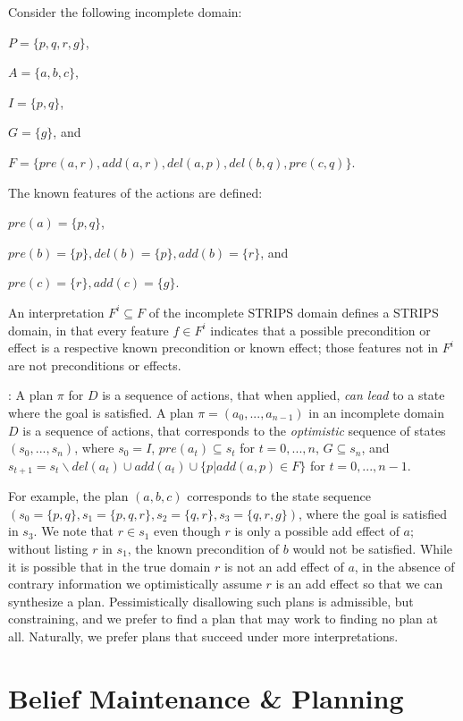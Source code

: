 \documentclass[letterpaper]{article}
\def\und#1{\noindent{\bf #1}:}
\begin{document}
Consider the following incomplete domain: 

$P = \{p, q, r, g\}$, 

${A} =
\{{a}, {b}, {c}\}$, 

$I = \{p, q\}$, 

 $G= \{g\}$, and 
 
 $F = \{pre(a, r), add(a, r),
del(a, p),del(b, q), pre(c, q) \}$.  

The
known features of the actions are defined: 

 $pre({a}) = \{p, q\}$, 
 
 $  pre({b}) =
\{p\},  del(b) = \{p\}, add({b}) = \{r\}$, and

  $ pre({c}) =
\{r\},  add({c}) = \{g\}$. 

An interpretation $F^i \subseteq F$ of the incomplete STRIPS domain
defines a STRIPS domain, in that every feature $f \in F^i$
indicates that a possible precondition or effect is a respective known
precondition or known effect; those features not in $F^i$ are
not preconditions or effects.   



\und{Incomplete STRIPS Plans} A plan $\pi$ for ${D}$ is a sequence of
actions, that when applied, {\em can lead} to a state where the goal is
satisfied.  A plan $\pi = ({a}_0,  ..., {a}_{n-1})$ in an incomplete
domain ${D}$ is a sequence of  actions, that corresponds to the {\em
optimistic} sequence of states $(s_0, ...,  s_n)$, where $s_0 = I$,
$pre({a}_t) \subseteq s_t$ for $t = 0,...,  n$, $G \subseteq s_n$,
and $s_{t+1} = s_t \backslash del({a}_t)  \cup
add({a}_t) \cup \{p | add(a, p) \in
F\}$ for $t = 0,...,
n-1$.

For example, the plan $({a}, {b}, {c})$ corresponds to the
state sequence $(s_0 = \{p, q\}, s_1 = \{p, q, r\}, s_2 = \{q, r\}, s_3 = \{q,
r, g\})$, where the goal is satisfied in $s_3$.  We note that $r \in s_1$ even
though $r$ is only a possible add effect of $a$; without listing $r$ in $s_1$,
the known precondition of $b$ would not be satisfied.  While it is possible that
in the true domain $r$ is not an add effect of $a$, in the absence of contrary
information we optimistically assume $r$ is an add effect so that we can
synthesize a plan.   Pessimistically disallowing such plans is admissible, but
constraining, and we prefer to find a plan that may work to finding no plan at
all.  Naturally, we prefer plans that succeed under more interpretations.

\section{Belief Maintenance \& Planning}
\end{document}
